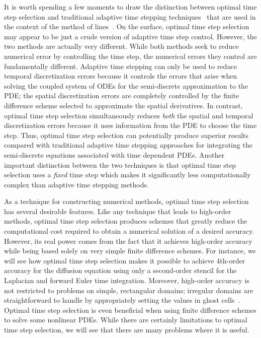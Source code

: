 \documentclass[oneeqnum,onefignum,onetabnum,onethmnum]{siamltex}
\begin{document}
It is worth spending a few moments to draw the distinction between optimal 
time step selection and traditional adaptive time stepping 
techniques~\cite{iserles_book,??} that are used in the context of the method 
of lines~\cite{iserles_book, gko_book}.  On the surface, optimal time step 
selection may appear to be just a crude version of adaptive time step control.
However, the two methods are actually very different.  While both methods seek 
to reduce numerical error by controlling the time step, the numerical errors 
they control are fundamentally different.  Adaptive time stepping can only 
be used to reduce temporal discretization errors because it controls the 
errors that arise when solving the coupled system of ODEs for the 
semi-discrete approximation to the PDE; the spatial discretization errors 
are completely controlled by the finite difference scheme selected to 
approximate the spatial derivatives.  
In contrast, optimal time step selection simultaneously reduces 
\emph{both} the spatial and temporal discretization errors because it
uses information from the PDE to choose the time step.  Thus, optimal time 
step selection can potentially produce superior results compared with 
traditional adaptive time stepping approaches for integrating the 
semi-discrete equations associated with time dependent PDEs.  Another 
important distinction between the two techniques is that optimal time step 
selection uses a \emph{fixed} time step which makes it significantly less 
computationally complex than adaptive time stepping methods.

As a technique for constructing numerical methods, optimal time step selection 
has several desirable features.  Like any technique that leads to high-order 
methods, optimal time step selection produces schemes that greatly reduce the 
computational cost required to obtain a numerical solution of a desired 
accuracy.  However, its real power comes from the fact that it achieves
high-order accuracy while being based solely on very simple finite difference 
schemes.  For instance, we will see how optimal time step selection makes 
it possible to achieve 4th-order accuracy for the diffusion equation using only 
a second-order stencil for the Laplacian and forward Euler time integration.  
Moreover, high-order accuracy is not restricted to problems on simple, 
rectangular domains; irregular domains are straightforward to handle by
appropriately setting the values in ghost cells~\cite{gibou_2005, fedkiw_1999, 
osher_fedkiw_book}.  Optimal time step selection is even beneficial when 
using finite difference schemes to solve some nonlinear PDEs.  While there 
are certainly limitations to optimal time step selection, we will see that 
there are many problems where it is useful.  
\end{document}
